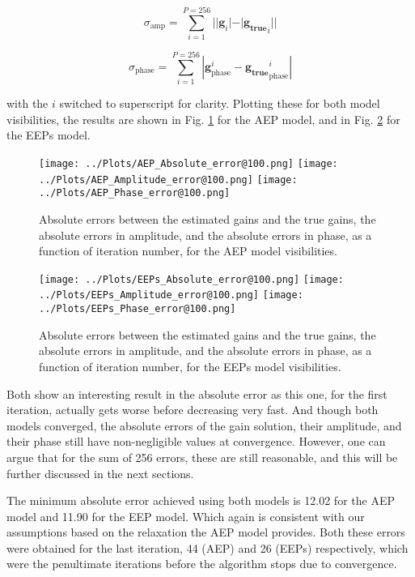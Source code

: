 \documentclass[12pt]{report} %
\begin{document}
\begin{equation}
    \sigma_{\text{amp}} = \sum_{i = 1}^{P = 256}||\mathbf{g}_{i}| - |\mathbf{g_{\text{true}}}_{i}||
\end{equation}

\begin{equation}
    \sigma_{\text{phase}} = \sum_{i = 1}^{P = 256}|\mathbf{g}^{i}_{\text{phase}} - \mathbf{g_{\text{true}}}^{i}_{\text{phase}}|
\end{equation}

with the $i$ switched to superscript for clarity. Plotting these for both model visibilities, the results are shown in Fig. \ref{fig:abs_error_AEP} for the AEP model, and in Fig. \ref{fig:abs_error_EEP} for the EEPs model.

\begin{figure}[h]
    \centering
    \texttt{[image: ../Plots/AEP\_Absolute\_error@100.png]}
    \texttt{[image: ../Plots/AEP\_Amplitude\_error@100.png]}
    \texttt{[image: ../Plots/AEP\_Phase\_error@100.png]}
    \caption{Absolute errors between the estimated gains and the true gains, the absolute errors in amplitude, and the absolute errors in phase, as a function of iteration number, for the AEP model visibilities.}
    \label{fig:abs_error_AEP}
\end{figure}

\begin{figure}[h]
  \centering
  \texttt{[image: ../Plots/EEPs\_Absolute\_error@100.png]}
  \texttt{[image: ../Plots/EEPs\_Amplitude\_error@100.png]}
  \texttt{[image: ../Plots/EEPs\_Phase\_error@100.png]}
  \caption{Absolute errors between the estimated gains and the true gains, the absolute errors in amplitude, and the absolute errors in phase, as a function of iteration number, for the EEPs model visibilities.}
  \label{fig:abs_error_EEP}
\end{figure}

Both show an interesting result in the absolute error as this one, for the first iteration, actually gets worse before decreasing very fast. And though both models converged, the absolute errors of the gain solution, their amplitude, and their phase still have non-negligible values at convergence. However, one can argue that for the sum of 256 errors, these are still reasonable, and this will be further discussed in the next sections.

The minimum absolute error achieved using both models is 12.02 for the AEP model and 11.90 for the EEP model. Which again is consistent with our assumptions based on the relaxation the AEP model provides. Both these errors were obtained for the last iteration, 44 (AEP) and 26 (EEPs) respectively, which were the penultimate iterations before the algorithm stops due to convergence.
\end{document}
